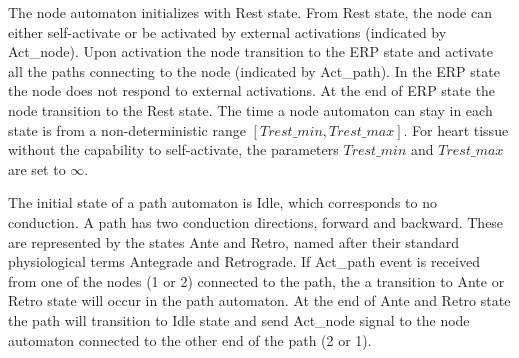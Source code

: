 The node automaton initializes with \textsf{Rest} state.
From \textsf{Rest} state, the node can either self-activate or be activated by external activations (indicated by Act\_node). Upon activation the node transition to the \textsf{ERP} state and activate all the paths connecting to the node (indicated by Act\_path). 
In the \textsf{ERP} state the node does not respond to external activations. At the end of \textsf{ERP} state the node transition to the \textsf{Rest} state. The time a node automaton can stay in each state is from a non-deterministic range $[Trest\_min,Trest\_max]$.
For heart tissue without the capability to self-activate, the parameters $Trest\_min$ and $Trest\_max$ are set to $\infty$.

The initial state of a path automaton is \textsf{Idle}, which corresponds to no conduction. 
A path has two conduction directions, forward and backward.
These are represented by the states \textsf{Ante} and \textsf{Retro}, named after their standard physiological terms Antegrade and Retrograde.
If \textsf{Act\_path} event is received from one of the nodes (1 or 2) connected to the path, the a transition to \textsf{Ante} or \textsf{Retro} state will occur in the path automaton. 
At the end of \textsf{Ante} and \textsf{Retro} state the path will transition to \textsf{Idle} state and send Act\_node signal to the node automaton connected to the other end of the path (2 or 1).
%
 
